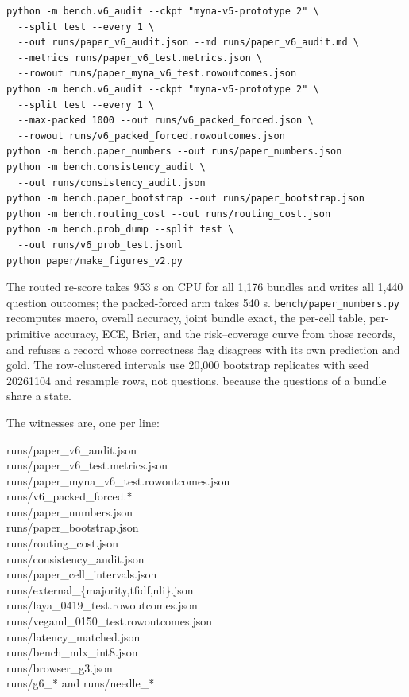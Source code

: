 \documentclass[11pt]{article}
\begin{document}
{\scriptsize
\begin{verbatim}
python -m bench.v6_audit --ckpt "myna-v5-prototype 2" \
  --split test --every 1 \
  --out runs/paper_v6_audit.json --md runs/paper_v6_audit.md \
  --metrics runs/paper_v6_test.metrics.json \
  --rowout runs/paper_myna_v6_test.rowoutcomes.json
python -m bench.v6_audit --ckpt "myna-v5-prototype 2" \
  --split test --every 1 \
  --max-packed 1000 --out runs/v6_packed_forced.json \
  --rowout runs/v6_packed_forced.rowoutcomes.json
python -m bench.paper_numbers --out runs/paper_numbers.json
python -m bench.consistency_audit \
  --out runs/consistency_audit.json
python -m bench.paper_bootstrap --out runs/paper_bootstrap.json
python -m bench.routing_cost --out runs/routing_cost.json
python -m bench.prob_dump --split test \
  --out runs/v6_prob_test.jsonl
python paper/make_figures_v2.py
\end{verbatim}
}

The routed re-score takes 953 s on CPU for all 1{,}176 bundles and writes all 1{,}440 question
outcomes; the packed-forced arm takes 540 s. \texttt{bench/paper\_numbers.py} recomputes macro,
overall accuracy, joint bundle exact, the per-cell table, per-primitive accuracy, ECE, Brier, and
the risk--coverage curve from those records, and refuses a record whose correctness flag disagrees
with its own prediction and gold. The row-clustered intervals use 20{,}000 bootstrap replicates with
seed 20261104 and resample rows, not questions, because the questions of a bundle share a state.

The witnesses are, one per line:
{\footnotesize\ttfamily\raggedright
runs/paper\_v6\_audit.json \\
runs/paper\_v6\_test.metrics.json \\
runs/paper\_myna\_v6\_test.rowoutcomes.json \\
runs/v6\_packed\_forced.* \\
runs/paper\_numbers.json \\
runs/paper\_bootstrap.json \\
runs/routing\_cost.json \\
runs/consistency\_audit.json \\
runs/paper\_cell\_intervals.json \\
runs/external\_\{majority,tfidf,nli\}.json \\
runs/laya\_0419\_test.rowoutcomes.json \\
runs/vegaml\_0150\_test.rowoutcomes.json \\
runs/latency\_matched.json \\
runs/bench\_mlx\_int8.json \\
runs/browser\_g3.json \\
runs/g6\_* and runs/needle\_* \\
\par}
\end{document}
